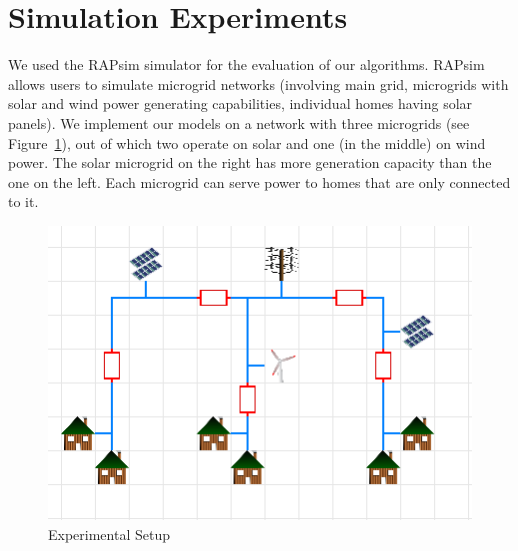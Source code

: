 \section{Simulation Experiments}\label{sec:experiments}
We used the RAPsim  simulator  \cite{rapsim} for the evaluation of our algorithms. RAPsim allows users to simulate microgrid networks (involving main grid, microgrids with solar and wind power generating capabilities, individual homes having solar panels). We implement our models on a network with three microgrids (see Figure~\ref{exp}), out of which two operate on solar and one (in the middle) on wind power. The solar microgrid on the right has more generation capacity than the one on the left. Each microgrid can serve power to homes that are only connected to it. 


\begin{figure}[thbp]
	\centering
	\includegraphics [scale = 0.6]{experimental_setup.jpg}
        \caption{Experimental Setup}
	\label{exp}
\end{figure}
